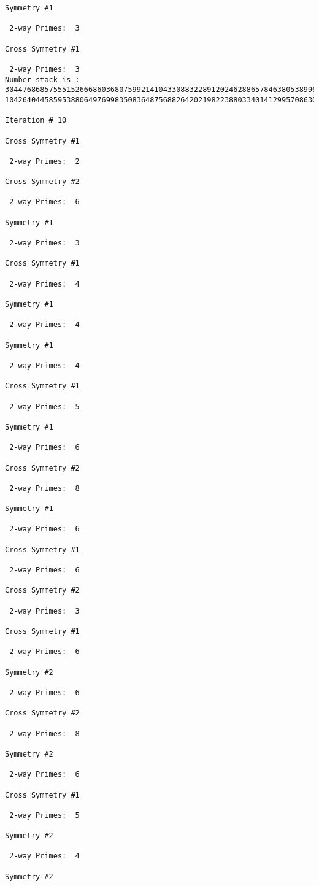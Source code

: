{{{{\begin{verbatim}
Symmetry #1

 2-way Primes: 	3

Cross Symmetry #1

 2-way Primes: 	3
Number stack is :
30447686857555152666860368075992141043308832289120246288657846380538996794608835958544046240163340857
10426404458595388064976998350836487568826420219822388033401412995708630686662515557586867440375804336

Iteration #	10

Cross Symmetry #1

 2-way Primes: 	2

Cross Symmetry #2

 2-way Primes: 	6

Symmetry #1

 2-way Primes: 	3

Cross Symmetry #1

 2-way Primes: 	4

Symmetry #1

 2-way Primes: 	4

Symmetry #1

 2-way Primes: 	4

Cross Symmetry #1

 2-way Primes: 	5

Symmetry #1

 2-way Primes: 	6

Cross Symmetry #2

 2-way Primes: 	8

Symmetry #1

 2-way Primes: 	6

Cross Symmetry #1

 2-way Primes: 	6

Cross Symmetry #2

 2-way Primes: 	3

Cross Symmetry #1

 2-way Primes: 	6

Symmetry #2

 2-way Primes: 	6

Cross Symmetry #2

 2-way Primes: 	8

Symmetry #2

 2-way Primes: 	6

Cross Symmetry #1

 2-way Primes: 	5

Symmetry #2

 2-way Primes: 	4

Symmetry #2


\end{verbatim}}}}}
